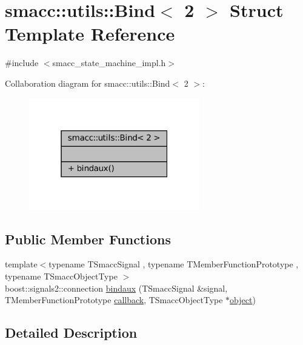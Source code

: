 \hypertarget{structsmacc_1_1utils_1_1Bind_3_012_01_4}{}\section{smacc\+:\+:utils\+:\+:Bind$<$ 2 $>$ Struct Template Reference}
\label{structsmacc_1_1utils_1_1Bind_3_012_01_4}


{\ttfamily \#include $<$smacc\+\_\+state\+\_\+machine\+\_\+impl.\+h$>$}



Collaboration diagram for smacc\+:\+:utils\+:\+:Bind$<$ 2 $>$\+:
\nopagebreak
\begin{figure}[H]
\begin{center}
\leavevmode
\includegraphics[width=211pt]{structsmacc_1_1utils_1_1Bind_3_012_01_4__coll__graph}
\end{center}
\end{figure}
\subsection*{Public Member Functions}
\begin{DoxyCompactItemize}
\item 
{\footnotesize template$<$typename T\+Smacc\+Signal , typename T\+Member\+Function\+Prototype , typename T\+Smacc\+Object\+Type $>$ }\\boost\+::signals2\+::connection \hyperlink{structsmacc_1_1utils_1_1Bind_3_012_01_4_aa9bba43cc8862f00155b17d2625bd99e}{bindaux} (T\+Smacc\+Signal \&signal, T\+Member\+Function\+Prototype \hyperlink{3_2servers_2opencv__perception__node_2opencv__perception__node_8cpp_a050e697bd654facce10ea3f6549669b3}{callback}, T\+Smacc\+Object\+Type $\ast$\hyperlink{classobject}{object})
\end{DoxyCompactItemize}


\subsection{Detailed Description}
